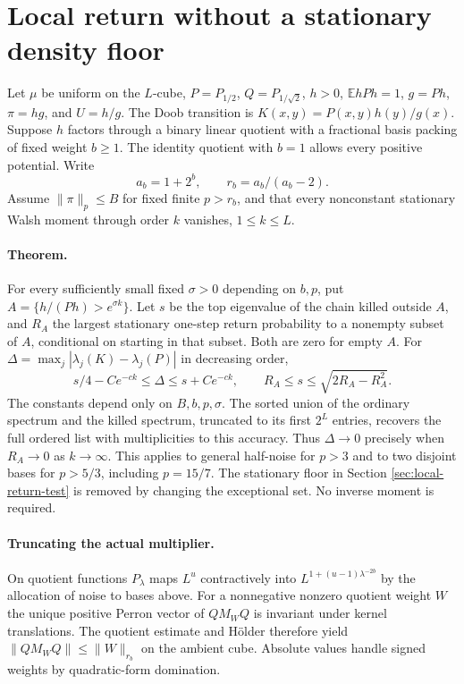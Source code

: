 \section{Local return without a stationary density floor}
\label{sec:floor-free}
Let $\mu$ be uniform on the $L$-cube, $P=P_{1/2}$, $Q=P_{1/\sqrt2}$,
$h>0$, $\mathbb E hPh=1$, $g=Ph$, $\pi=hg$, and $U=h/g$.
The Doob transition is $K(x,y)=P(x,y)h(y)/g(x)$.
Suppose $h$ factors through a binary linear quotient with a fractional
basis packing of fixed weight $b\ge1$. The identity quotient with $b=1$
allows every positive potential. Write
\[
 a_b=1+2^b,\qquad r_b=a_b/(a_b-2).
\]
Assume $\|\pi\|_p\le B$ for fixed finite $p>r_b$, and that every
nonconstant stationary Walsh moment through order $k$ vanishes, $1\le k\le L$.

\paragraph{Theorem.}
For every sufficiently small fixed $\sigma>0$ depending on $b,p$,
put $A=\{h/(Ph)>e^{\sigma k}\}$. Let $s$ be the top eigenvalue of the
chain killed outside $A$, and $R_A$ the largest stationary one-step
return probability to a nonempty subset of $A$, conditional on starting
in that subset. Both are zero for empty $A$. For
$\Delta=\max_j|\lambda_j(K)-\lambda_j(P)|$ in decreasing order,
\[
 s/4-Ce^{-ck}\le\Delta\le s+Ce^{-ck},\qquad
 R_A\le s\le\sqrt{2R_A-R_A^2}.                                      \tag{FF1}
\]
The constants depend only on $B,b,p,\sigma$. The sorted union of the
ordinary spectrum and the killed spectrum, truncated to its first $2^L$
entries, recovers the full ordered list with multiplicities to this
accuracy. Thus $\Delta\to0$ precisely when $R_A\to0$ as $k\to\infty$.
This applies to general half-noise for $p>3$ and to two disjoint bases
for $p>5/3$, including $p=15/7$. The stationary floor in Section
\ref{sec:local-return-test} is removed by changing the exceptional set.
No inverse moment is required.

\paragraph{Truncating the actual multiplier.}
On quotient functions $P_\lambda$ maps $L^u$ contractively into
$L^{1+(u-1)\lambda^{-2b}}$ by the allocation of noise to bases above.
For a nonnegative nonzero quotient weight $W$ the unique positive
Perron vector of $QM_WQ$ is invariant under kernel translations.
The quotient estimate and H\"older therefore yield
$\|QM_WQ\|\le\|W\|_{r_b}$ on the ambient cube. Absolute values handle
signed weights by quadratic-form domination.

